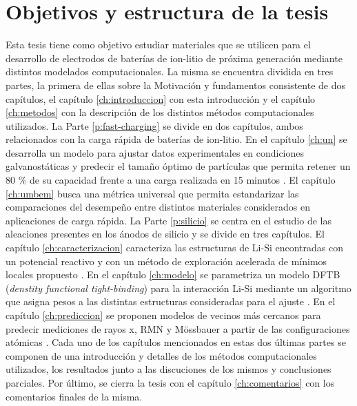 \section{Objetivos y estructura de la tesis}

Esta tesis tiene como objetivo estudiar materiales que se utilicen para el 
desarrollo de electrodos de baterías de ion-litio de próxima generación mediante 
distintos modelados computacionales. 
La misma se encuentra dividida en tres partes, la primera de ellas sobre la 
Motivación y fundamentos consistente de dos capítulos, el capítulo 
\ref{ch:introduccion} con esta introducción y el capítulo \ref{ch:metodos} con la
descripción de los distintos métodos computacionales utilizados. 
La Parte \ref{p:fast-charging} se divide en dos capítulos, ambos relacionados con 
la carga rápida de baterías de ion-litio. En el capítulo \ref{ch:un} se 
desarrolla un modelo para ajustar datos experimentales en condiciones 
galvanostáticas y predecir el tamaño óptimo de partículas que permita retener un 
80 \% de su capacidad frente a una carga realizada en 15 minutos 
\cite{fernandez2023towards}. El capítulo \ref{ch:umbem} busca una métrica 
universal que permita estandarizar las comparaciones del desempeño entre 
distintos materiales considerados en aplicaciones de carga rápida.
La Parte \ref{p:silicio} se centra en el estudio de las aleaciones presentes en 
los ánodos de silicio y se divide en tres capítulos. El capítulo 
\ref{ch:caracterizacion} caracteriza las estructuras de Li-Si encontradas con 
un potencial reactivo y con un método de exploración acelerada de mínimos locales
propuesto \cite{fernandez2021characterization}. En el capítulo \ref{ch:modelo} se
parametriza un modelo DFTB (\textit{denstity functional tight-binding}) para la 
interacción Li-Si mediante un algoritmo que asigna pesos a las distintas 
estructuras consideradas para el ajuste \cite{oviedo2023}. En el capítulo 
\ref{ch:prediccion} se proponen modelos de vecinos más cercanos para predecir 
mediciones de rayos x, RMN y Mössbauer a partir de las configuraciones atómicas
\cite{fernandez2023nmr}.
Cada uno de los capítulos mencionados en estas dos últimas partes se componen
de una introducción y detalles de los métodos computacionales utilizados, los 
resultados junto a las discuciones de los mismos y conclusiones parciales.
Por último, se cierra la tesis con el capítulo \ref{ch:comentarios} con los 
comentarios finales de la misma.
